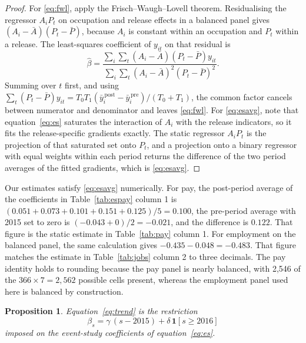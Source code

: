 \documentclass[12pt,leqno]{article}
\newtheorem{proposition}{Proposition}
\begin{document}
\begin{proof}
For \eqref{eq:fwl}, apply the Frisch--Waugh--Lovell theorem. Residualising the regressor $A_i P_t$ on occupation and release effects in a balanced panel gives $\left(A_i - \bar{A}\right)\left(P_t - \bar{P}\right)$, because $A_i$ is constant within an occupation and $P_t$ within a release. The least-squares coefficient of $y_{it}$ on that residual is
\begin{equation}
\hat{\beta} = \frac{\sum_i \sum_t \left(A_i - \bar{A}\right)\left(P_t - \bar{P}\right) y_{it}}{\sum_i \sum_t \left(A_i - \bar{A}\right)^{2}\left(P_t - \bar{P}\right)^{2}} .
\end{equation}
Summing over $t$ first, and using $\sum_t (P_t - \bar{P}) y_{it} = T_0 T_1 (\bar{y}^{\,\mathrm{post}}_i - \bar{y}^{\,\mathrm{pre}}_i) / (T_0 + T_1)$, the common factor cancels between numerator and denominator and leaves \eqref{eq:fwl}. For \eqref{eq:esavg}, note that equation~\eqref{eq:es} saturates the interaction of $A_i$ with the release indicators, so it fits the release-specific gradients exactly. The static regressor $A_i P_t$ is the projection of that saturated set onto $P_t$, and a projection onto a binary regressor with equal weights within each period returns the difference of the two period averages of the fitted gradients, which is \eqref{eq:esavg}.
\end{proof}

Our estimates satisfy \eqref{eq:esavg} numerically. For pay, the post-period average of the coefficients in Table~\ref{tab:espay} column 1 is $(0.051 + 0.073 + 0.101 + 0.151 + 0.125)/5 = 0.100$, the pre-period average with 2015 set to zero is $(-0.043 + 0)/2 = -0.021$, and the difference is $0.122$. That figure is the static estimate in Table~\ref{tab:pay} column 1. For employment on the balanced panel, the same calculation gives $-0.435 - 0.048 = -0.483$. That figure matches the estimate in Table~\ref{tab:jobs} column 2 to three decimals. The pay identity holds to rounding because the pay panel is nearly balanced, with 2,546 of the $366 \times 7 = 2{,}562$ possible cells present, whereas the employment panel used here is balanced by construction.

\begin{proposition}\label{prop:restriction}
Equation~\eqref{eq:trend} is the restriction
\begin{equation}
\beta_s = \gamma\,(s - 2015) + \delta\, \mathbf{1}[s \geq 2016]
\end{equation}
imposed on the event-study coefficients of equation~\eqref{eq:es}.
\end{proposition}
\end{document}
